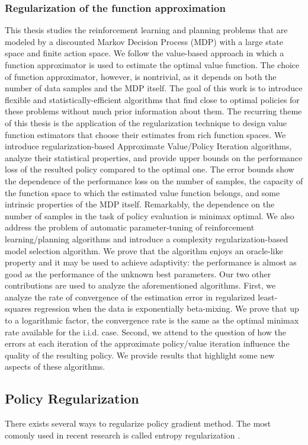 \subsubsection{Regularization of the function approximation}
\cite{farahmand2011regularization}
This thesis studies the reinforcement learning and planning problems that are modeled by a discounted Markov Decision Process (MDP) with a large state space and finite action space. We follow the value-based approach in which a function approximator is used to estimate the optimal value function. The choice of function approximator, however, is nontrivial, as it depends on both the number of data samples and the MDP itself. The goal of this work is to introduce flexible and statistically-efficient algorithms that find close to optimal policies for these problems without much prior information about them. The recurring theme of this thesis is the application of the regularization technique to design value function estimators that choose their estimates from rich function spaces. We introduce regularization-based Approximate Value/Policy Iteration algorithms, analyze their statistical properties, and provide upper bounds on the performance loss of the resulted policy compared to the optimal one. The error bounds show the dependence of the performance loss on the number of samples, the capacity of the function space to which the estimated value function belongs, and some intrinsic properties of the MDP itself. Remarkably, the dependence on the number of samples in the task of policy evaluation is minimax optimal. We also address the problem of automatic parameter-tuning of reinforcement learning/planning algorithms and introduce a complexity regularization-based model selection algorithm. We prove that the algorithm enjoys an oracle-like property and it may be used to achieve adaptivity: the performance is almost as good as the performance of the unknown best parameters. Our two other contributions are used to analyze the aforementioned algorithms. First, we analyze the rate of convergence of the estimation error in regularized least-squares regression when the data is exponentially beta-mixing. We prove that up to a logarithmic factor, the convergence rate is the same as the optimal minimax rate available for the i.i.d. case. Second, we attend to the question of how the errors at each iteration of the approximate policy/value iteration influence the quality of the resulting policy. We provide results that highlight some new aspects of these algorithms.

\subsection{Policy Regularization}
There exists several ways to regularize policy gradient method. The most comonly used in recent research is called entropy regularization \cite{neu2017unified,schulman2017proximal,bartlett2009regal}.
